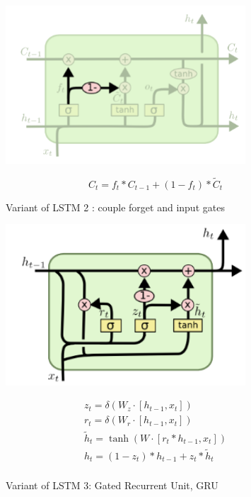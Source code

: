 \documentclass[12pt,a4paper]{article}
\begin{document}
\begin{figure}
\begin{minipage}[c]{0.5\textwidth}
\centering   
\includegraphics[width=0.8\textwidth]{pic/11.PNG}
\end{minipage}
%
\begin{minipage}[c]{0.5\textwidth}
\begin{equation*}
	C_t = f_t * C_{t-1} + (1 -f_t) * \tilde{C}_t
\end{equation*}

\end{minipage}
 \caption{Variant of LSTM 2 : couple forget and input gates}
 \label{fig:11} 
\end{figure}


\begin{figure}
\begin{minipage}[c]{0.5\textwidth}
\centering   
\includegraphics[width=0.8\textwidth]{pic/12.PNG}
\end{minipage}
%
\begin{minipage}[c]{0.5\textwidth}
\begin{equation*}
	\begin{array}{l}
	z_t = \delta(W_z \cdot [h_{t-1}, x_t]) \\
	r_t = \delta(W_r \cdot [h_{t-1}, x_t]) \\
	\tilde{h}_{t} = \tanh(W \cdot [r_t * h_{t-1}, x_{t}])\\
	h_t = (1-z_t) * h_{t-1} + z_t * \tilde{h}_t \\
	\end{array}
\end{equation*}
\end{minipage}
\label{fig:12} 
\caption{Variant of LSTM 3: Gated Recurrent Unit, GRU}
\end{figure}

%


\end{document}
